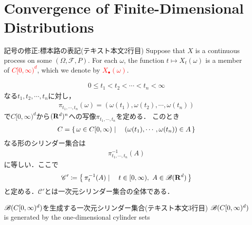 \section{Convergence of Finite-Dimensional Distributions}
	\begin{itembox}[l]{記号の修正:標本路の表記(テキスト本文2行目)}
		Suppose that $X$ is a continuous process on some $(\Omega,\mathscr{F},P)$.
		For each $\omega$, the function $t \longmapsto X_t(\omega)$ is a member of
		\textcolor{red}{$C[0,\infty)^d$}, which we denote by \textcolor{red}{$X_\bullet(\omega)$}.
	\end{itembox}
	
	\begin{align}
		0 \leq t_1 < t_2 < \cdots < t_n < \infty
	\end{align}
	なる$t_1,t_2,\cdots,t_n$に対し，
	\begin{align}
		\pi_{t_1,\cdots,t_n}(\omega) = (\omega(t_1),\omega(t_2),\cdots,\omega(t_n))
	\end{align}
	で$C[0,\infty)^d$から$(\mathbf{R}^d)^n$への写像$\pi_{t_1,\cdots,t_n}$を定める．
	このとき
	\begin{align}
		C = \left\{\, \omega \in C[0,\infty) \mid \quad (\omega(t_1),\cdots,\omega(t_n)) \in A\, \right\}
	\end{align}
	なる形のシリンダー集合は
	\begin{align}
		\pi_{t_1,\cdots,t_n}^{-1}(A)
	\end{align}
	に等しい．ここで
	\begin{align}
		\mathscr{C}' \coloneqq \left\{\, \pi_t^{-1}(A) \mid \quad t \in [0,\infty),\ A \in \mathscr{B}(\mathbf{R}^d)\, \right\}
	\end{align}
	と定める．$\mathscr{C}'$とは一次元シリンダー集合の全体である．
	
	\begin{itembox}[l]{$\mathscr{B}(C[0,\infty)^d)$を生成する一次元シリンダー集合(テキスト本文3行目)}
		\textcolor{red}{$\mathscr{B}(C[0,\infty)^d)$} is generated by the 
		one-dimensional cylinder sets
	\end{itembox}
	
